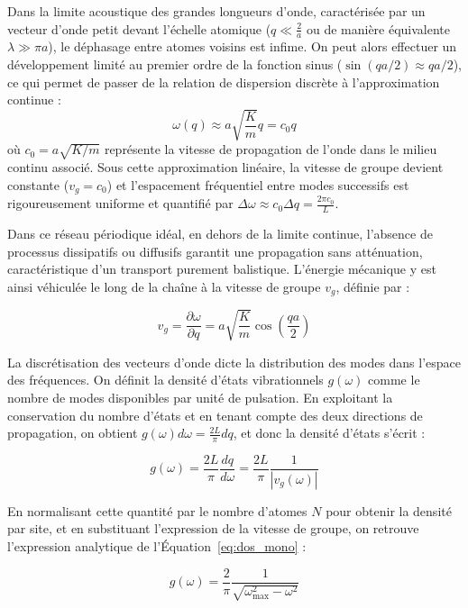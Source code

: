 Dans la limite acoustique des grandes longueurs d'onde, caractérisée par un vecteur d'onde petit devant l'échelle atomique ($q \ll \frac{2}{a}$ ou de manière équivalente $\lambda \gg \pi a$), le déphasage entre atomes voisins est infime. On peut alors effectuer un développement limité au premier ordre de la fonction sinus ($\sin(qa/2) \approx qa/2$), ce qui permet de passer de la relation de dispersion discrète à l'approximation continue :
\begin{equation*}
    \omega(q) \approx a \sqrt{\frac{K}{m}} q = c_0 q
\end{equation*}
où $c_0 = a \sqrt{K/m}$ représente la vitesse de propagation de l'onde dans le milieu continu associé. Sous cette approximation linéaire, la vitesse de groupe devient constante ($v_g = c_0$) et l'espacement fréquentiel entre modes successifs est rigoureusement uniforme et quantifié par $\Delta \omega \approx c_0 \Delta q = \frac{2\pi c_0}{L}$.

Dans ce réseau périodique idéal, en dehors de la limite continue, l'absence de processus dissipatifs ou diffusifs garantit une propagation sans atténuation, caractéristique d'un transport purement balistique. L'énergie mécanique y est ainsi véhiculée le long de la chaîne à la vitesse de groupe $v_g$, définie par :

\begin{equation*}
    v_g = \frac{\partial \omega}{\partial q} = a \sqrt{\frac{K}{m}} \cos\left(\frac{qa}{2}\right)
\end{equation*}

La discrétisation des vecteurs d'onde dicte la distribution des modes dans l'espace des fréquences. On définit la densité d'états vibrationnels $g(\omega)$ comme le nombre de modes disponibles par unité de pulsation. En exploitant la conservation du nombre d'états et en tenant compte des deux directions de propagation, on obtient $g(\omega)d\omega = \frac{2L}{\pi}dq$, et donc la densité d'états s'écrit :

\begin{equation*}
    g(\omega) = \frac{2L}{\pi} \frac{dq}{d\omega} = \frac{2L}{\pi} \frac{1}{|v_g(\omega)|}
\end{equation*}

En normalisant cette quantité par le nombre d'atomes $N$ pour obtenir la densité par site, et en substituant l'expression de la vitesse de groupe, on retrouve l'expression analytique de l'Équation~\eqref{eq:dos_mono} :

\begin{equation*}
    g(\omega) = \frac{2}{\pi} \frac{1}{\sqrt{\omega_{\max}^2 - \omega^2}}
\end{equation*}

